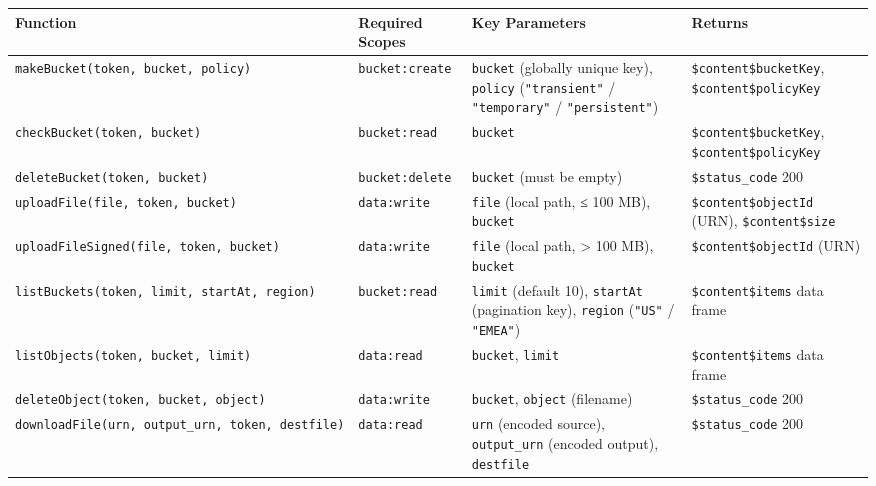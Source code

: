 \documentclass[
  11pt,
  letterpaper,
  DIV=11,
  numbers=noendperiod]{scrreprt}
\begin{document}
\begin{longtable}[]{@{}
  >{\raggedright\arraybackslash}p{}
  >{\raggedright\arraybackslash}p{}
  >{\raggedright\arraybackslash}p{}
  >{\raggedright\arraybackslash}p{}@{}}
\toprule\noalign{}
\begin{minipage}[b]{\linewidth}\raggedright
Function
\end{minipage} & \begin{minipage}[b]{\linewidth}\raggedright
Required Scopes
\end{minipage} & \begin{minipage}[b]{\linewidth}\raggedright
Key Parameters
\end{minipage} & \begin{minipage}[b]{\linewidth}\raggedright
Returns
\end{minipage} \\
\midrule\noalign{}
\endhead
\bottomrule\noalign{}
\endlastfoot
\texttt{makeBucket(token,\ bucket,\ policy)} & \texttt{bucket:create} &
\texttt{bucket} (globally unique key), \texttt{policy}
(\texttt{"transient"} / \texttt{"temporary"} / \texttt{"persistent"}) &
\texttt{\$content\$bucketKey}, \texttt{\$content\$policyKey} \\
\texttt{checkBucket(token,\ bucket)} & \texttt{bucket:read} &
\texttt{bucket} & \texttt{\$content\$bucketKey},
\texttt{\$content\$policyKey} \\
\texttt{deleteBucket(token,\ bucket)} & \texttt{bucket:delete} &
\texttt{bucket} (must be empty) & \texttt{\$status\_code} 200 \\
\texttt{uploadFile(file,\ token,\ bucket)} & \texttt{data:write} &
\texttt{file} (local path, ≤ 100 MB), \texttt{bucket} &
\texttt{\$content\$objectId} (URN), \texttt{\$content\$size} \\
\texttt{uploadFileSigned(file,\ token,\ bucket)} & \texttt{data:write} &
\texttt{file} (local path, \textgreater{} 100 MB), \texttt{bucket} &
\texttt{\$content\$objectId} (URN) \\
\texttt{listBuckets(token,\ limit,\ startAt,\ region)} &
\texttt{bucket:read} & \texttt{limit} (default 10), \texttt{startAt}
(pagination key), \texttt{region} (\texttt{"US"} / \texttt{"EMEA"}) &
\texttt{\$content\$items} data frame \\
\texttt{listObjects(token,\ bucket,\ limit)} & \texttt{data:read} &
\texttt{bucket}, \texttt{limit} & \texttt{\$content\$items} data
frame \\
\texttt{deleteObject(token,\ bucket,\ object)} & \texttt{data:write} &
\texttt{bucket}, \texttt{object} (filename) & \texttt{\$status\_code}
200 \\
\texttt{downloadFile(urn,\ output\_urn,\ token,\ destfile)} &
\texttt{data:read} & \texttt{urn} (encoded source), \texttt{output\_urn}
(encoded output), \texttt{destfile} & \texttt{\$status\_code} 200 \\
\end{longtable}
\end{document}
